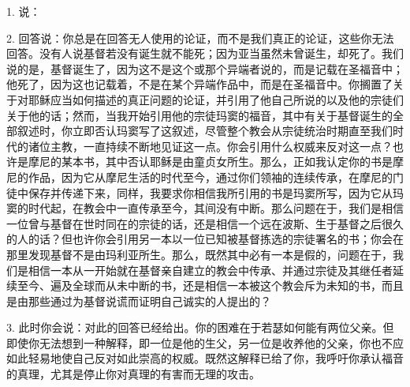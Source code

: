\par

1. 说：\par

2. 回答说：你总是在回答无人使用的论证，而不是我们真正的论证，这些你无法回答。没有人说基督若没有诞生就不能死；因为亚当虽然未曾诞生，却死了。我们说的是，基督诞生了，因为这不是这个或那个异端者说的，而是记载在圣福音中；他死了，因为这也记载着，不是在某个异端作品中，而是在圣福音中。你搁置了关于对耶稣应当如何描述的真正问题的论证，并引用了他自己所说的以及他的宗徒们关于他的话；然而，当我开始引用他的宗徒玛窦的福音，其中有关于基督诞生的全部叙述时，你立即否认玛窦写了这叙述，尽管整个教会从宗徒统治时期直至我们时代的诸位主教，一直持续不断地见证这一点。你会引用什么权威来反对这一点？也许是摩尼的某本书，其中否认耶稣是由童贞女所生。那么，正如我认定你的书是摩尼的作品，因为它从摩尼生活的时代至今，通过你们领袖的连续传承，在摩尼的门徒中保存并传递下来，同样，我要求你相信我所引用的书是玛窦所写，因为它从玛窦的时代起，在教会中一直传承至今，其间没有中断。那么问题在于，我们是相信一位曾与基督在世时同在的宗徒的话，还是相信一个远在波斯、生于基督之后很久的人的话？但也许你会引用另一本以一位已知被基督拣选的宗徒署名的书；你会在那里发现基督不是由玛利亚所生。那么，既然其中必有一本是假的，问题在于，我们是相信一本从一开始就在基督亲自建立的教会中传承、并通过宗徒及其继任者延续至今、遍及全球而从未中断的书，还是相信一本被这个教会斥为未知的书，而且是由那些通过为基督说谎而证明自己诚实的人提出的？\par

3. 此时你会说：对此的回答已经给出。你的困难在于若瑟如何能有两位父亲。但即使你无法想到一种解释，即一位是他的生父，另一位是收养他的父亲，你也不应如此轻易地使自己反对如此崇高的权威。既然这解释已给了你，我呼吁你承认福音的真理，尤其是停止你对真理的有害而无理的攻击。\par

